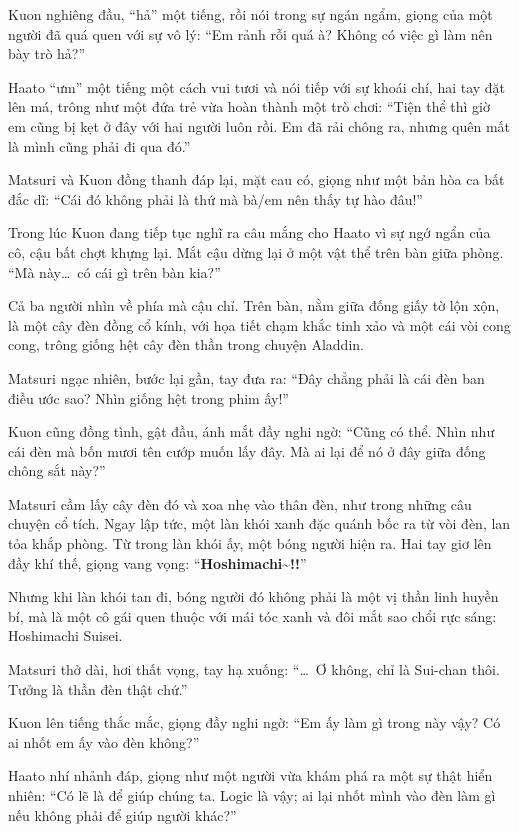 \documentclass[../main.tex]{subfiles}
\begin{document}

Kuon nghiêng đầu, ``hả'' một tiếng, rồi nói trong sự ngán ngẩm, giọng của một người đã quá quen với sự vô lý: ``Em rảnh rỗi quá à? Không có việc gì làm nên bày trò hả?''

Haato ``ưm'' một tiếng một cách vui tươi và nói tiếp với sự khoái chí, hai tay đặt lên má, trông như một đứa trẻ vừa hoàn thành một trò chơi: ``Tiện thể thì giờ em cũng bị kẹt ở đây với hai người luôn rồi. Em đã rải chông ra, nhưng quên mất là mình cũng phải đi qua đó.''

Matsuri và Kuon đồng thanh đáp lại, mặt cau có, giọng như một bản hòa ca bất đắc dĩ: ``Cái đó không phải là thứ mà bà/em nên thấy tự hào đâu!''

Trong lúc Kuon đang tiếp tục nghĩ ra câu mắng cho Haato vì sự ngớ ngẩn của cô, cậu bất chợt khựng lại. Mắt cậu dừng lại ở một vật thể trên bàn giữa phòng. ``Mà này\dots\ có cái gì trên bàn kia?''

Cả ba người nhìn về phía mà cậu chỉ. Trên bàn, nằm giữa đống giấy tờ lộn xộn, là một cây đèn đồng cổ kính, với họa tiết chạm khắc tinh xảo và một cái vòi cong cong, trông giống hệt cây đèn thần trong chuyện Aladdin.

Matsuri ngạc nhiên, bước lại gần, tay đưa ra: ``Đây chẳng phải là cái đèn ban điều ước sao? Nhìn giống hệt trong phim ấy!''

Kuon cũng đồng tình, gật đầu, ánh mắt đầy nghi ngờ: ``Cũng có thể. Nhìn như cái đèn mà bốn mươi tên cướp muốn lấy đây. Mà ai lại để nó ở đây giữa đống chông sắt này?''


Matsuri cầm lấy cây đèn đó và xoa nhẹ vào thân đèn, như trong những câu chuyện cổ tích. Ngay lập tức, một làn khói xanh đặc quánh bốc ra từ vòi đèn, lan tỏa khắp phòng. Từ trong làn khói ấy, một bóng người hiện ra. Hai tay giơ lên đầy khí thế, giọng vang vọng: ``\textbf{Hoshimachi\~{}!!}''

Nhưng khi làn khói tan đi, bóng người đó không phải là một vị thần linh huyền bí, mà là một cô gái quen thuộc với mái tóc xanh và đôi mắt sao chổi rực sáng: Hoshimachi Suisei.

Matsuri thở dài, hơi thất vọng, tay hạ xuống: ``\dots\ Ơ không, chỉ là Sui-chan thôi. Tưởng là thần đèn thật chứ.''

Kuon lên tiếng thắc mắc, giọng đầy nghi ngờ: ``Em ấy làm gì trong này vậy? Có ai nhốt em ấy vào đèn không?''

Haato nhí nhảnh đáp, giọng như một người vừa khám phá ra một sự thật hiển nhiên: ``Có lẽ là để giúp chúng ta. Logic là vậy; ai lại nhốt mình vào đèn làm gì nếu không phải để giúp người khác?''
\end{document}
